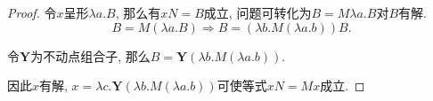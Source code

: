\begin{proof}
    令$x$呈形$\lambda a. B$, 那么有$xN=B$成立, 问题可转化为$B=M\lambda a. B$对$B$有解.
	$$B=M(\lambda a. B)\Rightarrow B=(\lambda b.M(\lambda a. b)) B.$$
	
	令$\mathbf{Y}$为不动点组合子, 那么$B=\mathbf{Y}(\lambda b.M(\lambda a.b))$.
	
	因此$x$有解, $x=\lambda c.\mathbf{Y}(\lambda b.M(\lambda a.b))$可使等式$xN=Mx$成立.
\end{proof}